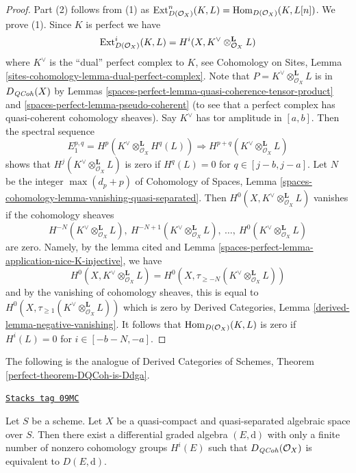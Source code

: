 \begin{proof}
Part (2) follows from (1) as $\operatorname{Ext}^n_{D(\mathcal{O}_X)}(K, L) =
\operatorname{Hom}_{D(\mathcal{O}_X)}(K, L[n])$. We prove (1).
Since $K$ is perfect we have
$$
\operatorname{Ext}^i_{D(\mathcal{O}_X)}(K, L) =
H^i(X, K^\vee \otimes_{\mathcal{O}_X}^\mathbf{L} L)
$$
where $K^\vee$ is the ``dual'' perfect complex to $K$, see
Cohomology on Sites, Lemma \ref{sites-cohomology-lemma-dual-perfect-complex}.
Note that $P = K^\vee \otimes_{\mathcal{O}_X}^\mathbf{L} L$
is in $D_{\mathit{QCoh}}(X)$ by
Lemmas \ref{spaces-perfect-lemma-quasi-coherence-tensor-product} and
\ref{spaces-perfect-lemma-pseudo-coherent} (to see that a perfect complex
has quasi-coherent cohomology sheaves). Say $K^\vee$ has
tor amplitude in $[a, b]$. Then the spectral sequence
$$
E_1^{p, q} = H^p(K^\vee \otimes_{\mathcal{O}_X}^\mathbf{L} H^q(L))
\Rightarrow
H^{p + q}(K^\vee \otimes_{\mathcal{O}_X}^\mathbf{L} L)
$$
shows that $H^j(K^\vee \otimes_{\mathcal{O}_X}^\mathbf{L} L)$
is zero if $H^q(L) = 0$ for $q \in [j - b, j - a]$.
Let $N$ be the integer $\max(d_p + p)$ of
Cohomology of Spaces, Lemma
\ref{spaces-cohomology-lemma-vanishing-quasi-separated}.
Then $H^0(X, K^\vee \otimes_{\mathcal{O}_X}^\mathbf{L} L)$
vanishes if the cohomology sheaves
$$
H^{-N}(K^\vee \otimes_{\mathcal{O}_X}^\mathbf{L} L),
\ H^{-N + 1}(K^\vee \otimes_{\mathcal{O}_X}^\mathbf{L} L),
\ \ldots,
\ H^0(K^\vee \otimes_{\mathcal{O}_X}^\mathbf{L} L)
$$
are zero. Namely, by the lemma cited and
Lemma \ref{spaces-perfect-lemma-application-nice-K-injective}, we have
$$
H^0(X, K^\vee \otimes_{\mathcal{O}_X}^\mathbf{L} L) =
H^0(X, \tau_{\geq -N}(K^\vee \otimes_{\mathcal{O}_X}^\mathbf{L} L))
$$
and by the vanishing of cohomology sheaves, this is equal to
$H^0(X, \tau_{\geq 1}(K^\vee \otimes_{\mathcal{O}_X}^\mathbf{L} L))$
which is zero by Derived Categories, Lemma
\ref{derived-lemma-negative-vanishing}.
It follows that $\operatorname{Hom}_{D(\mathcal{O}_X)}(K, L)$ is zero if
$H^i(L) = 0$ for $i \in [-b - N, -a]$.
\end{proof}

The following is the analogue of
Derived Categories of Schemes, Theorem \ref{perfect-theorem-DQCoh-is-Ddga}.

\begin{theorem}
\label{spaces-perfect-theorem-DQCoh-is-Ddga}
\href{https://stacks.math.columbia.edu/tag/09MC}{\texttt{Stacks tag 09MC}}

Let $S$ be a scheme.
Let $X$ be a quasi-compact and quasi-separated algebraic space over $S$.
Then there exist a differential graded algebra $(E, \text{d})$
with only a finite number of nonzero cohomology groups $H^i(E)$
such that $D_{\mathit{QCoh}}(\mathcal{O}_X)$ is equivalent
to $D(E, \text{d})$.
\end{theorem}

